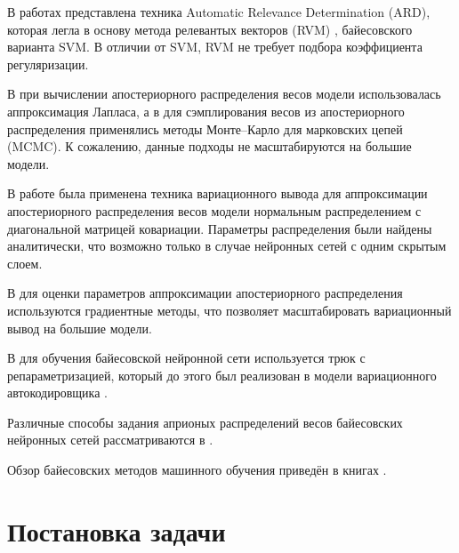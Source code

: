 \documentclass{article}
\numberwithin{equation}{section}
\begin{document}
    В работах \cite{mackay_1994, mackay_1995, nea_96}
    представлена техника Automatic Relevance Determination (ARD),
    которая легла в основу метода релевантых векторов (RVM) \cite{tipping_01},
    байесовского варианта SVM.
    В отличии от SVM, RVM не требует подбора коэффициента регуляризации.

    В \cite{mackay_1992a, mackay_1992b, mackay_1992c, mackay_1994, mackay_1995}
    при вычислении апостериорного распределения весов модели использовалась
    аппроксимация Лапласа, а в \cite{nea_96} для сэмплирования весов
    из апостериорного распределения применялись методы
    Монте--Карло для марковских цепей (MCMC).
    К сожалению, данные подходы не масштабируются на большие модели.

    В работе \cite{hinton_van_camp_1993} была применена техника вариационного вывода
    для аппроксимации апостериорного распределения весов модели
    нормальным распределением с диагональной матрицей ковариации.
    Параметры распределения были найдены аналитически,
    что возможно только в случае нейронных сетей
    с одним скрытым слоем.

    В \cite{gra_11} для оценки параметров аппроксимации апостериорного распределения
    используются градиентные методы, что позволяет масштабировать вариационный вывод
    на большие модели.

    В \cite{blu_15} для обучения байесовской нейронной сети
    используется трюк с репараметризацией, который до этого был реализован в модели
    вариационного автокодировщика \cite{kingma_2013}.

    Различные способы задания априоных распределений весов
    байесовских нейронных сетей рассматриваются в
    \cite{nal_18, wi_20, hoe_21, for_22}.

    Обзор байесовских методов машинного обучения приведён в книгах
    \cite{bishop2006, murphy_book_1, murphy_book_2}.

    \section{Постановка задачи}
\end{document}
